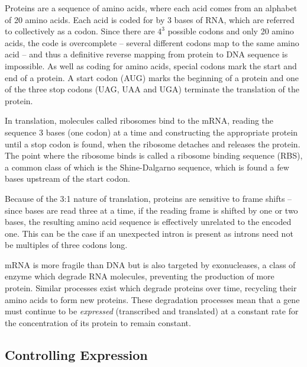 Proteins are a sequence of amino acids, where each acid comes from an alphabet
of 20 amino acids.
Each acid is coded for by 3 bases of RNA, which are referred to collectively 
as a codon.
Since there are $4^3$ possible codons and only 20 amino acids, the code is
overcomplete -- several different codons map to the same amino acid -- and
thus a definitive reverse mapping from protein to DNA sequence is impossible.
As well as coding for amino acids, special codons mark the start and end of a
protein.
A start codon (AUG) marks the beginning of a protein and one of the three stop 
codons (UAG, UAA and UGA) terminate the translation of the protein.

In translation, molecules called ribosomes bind to the mRNA, reading the
sequence 3 bases (one codon) at a time and constructing the appropriate protein
until a stop codon is found, when the ribosome detaches and releases the
protein.
The point where the ribosome binds is called a ribosome binding sequence (RBS),
a common class of which is the Shine-Dalgarno sequence, which is found a few 
bases upstream of the start codon.

Because of the 3:1 nature of translation, proteins are sensitive to frame
shifts -- since bases are read three at a time, if the reading frame is shifted 
by one or two bases, the resulting amino acid sequence is effectively unrelated 
to the encoded one.
This can be the case if an unexpected intron is present as introns need not be 
multiples of three codons long.

mRNA is more fragile than DNA but is also targeted by exonucleases, a class of
enzyme which degrade RNA molecules, preventing the production of more protein.
Similar processes exist which degrade proteins over time, recycling their amino
acids to form new proteins.
These degradation processes mean that a gene must continue to be 
\emph{expressed} (transcribed and translated) at a constant rate for the 
concentration of its protein to remain constant.

\subsection{Controlling Expression}
\label{sec:mbio_control}

